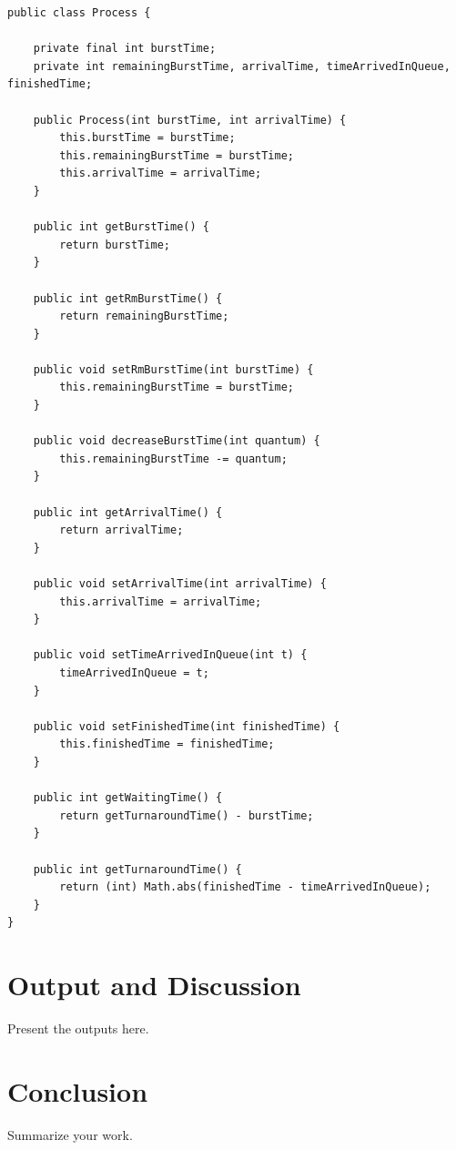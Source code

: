 \documentclass[12pt]{article}
\begin{document}
\begin{lstlisting}
public class Process {

    private final int burstTime;
    private int remainingBurstTime, arrivalTime, timeArrivedInQueue, finishedTime;

    public Process(int burstTime, int arrivalTime) {
        this.burstTime = burstTime;
        this.remainingBurstTime = burstTime;
        this.arrivalTime = arrivalTime;
    }

    public int getBurstTime() {
        return burstTime;
    }

    public int getRmBurstTime() {
        return remainingBurstTime;
    }

    public void setRmBurstTime(int burstTime) {
        this.remainingBurstTime = burstTime;
    }

    public void decreaseBurstTime(int quantum) {
        this.remainingBurstTime -= quantum;
    }

    public int getArrivalTime() {
        return arrivalTime;
    }

    public void setArrivalTime(int arrivalTime) {
        this.arrivalTime = arrivalTime;
    }

    public void setTimeArrivedInQueue(int t) {
        timeArrivedInQueue = t;
    }

    public void setFinishedTime(int finishedTime) {
        this.finishedTime = finishedTime;
    }

    public int getWaitingTime() {
        return getTurnaroundTime() - burstTime;
    }

    public int getTurnaroundTime() {
        return (int) Math.abs(finishedTime - timeArrivedInQueue);
    }
}
\end{lstlisting}

\newpage
\section{Output and Discussion}
Present the outputs here.

\newpage
\section{Conclusion}
Summarize your work.


\newpage


\end{document}
